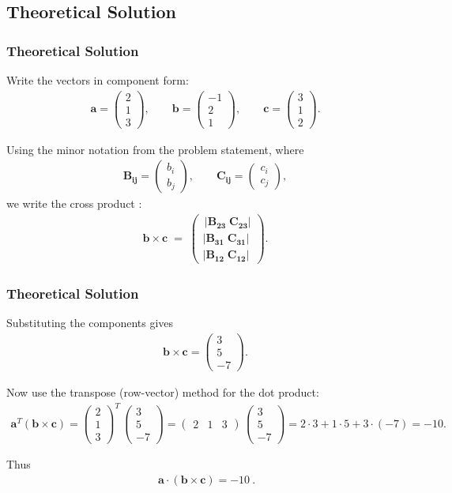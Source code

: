 \documentclass{beamer}
\theoremstyle{remark}
\newcommand{\myvec}[1]{\ensuremath{\begin{pmatrix}#1\end{pmatrix}}}
\let\vec\mathbf
\numberwithin{equation}{section}
\begin{document}
\subsection{Theoretical Solution }
\begin{frame}
\frametitle{Theoretical Solution}
Write the vectors in component form:
\begin{align}
\vec a=\myvec{2\\[4pt]1\\[4pt]3},\qquad
\vec b=\myvec{-1\\[4pt]2\\[4pt]1},\qquad
\vec c=\myvec{3\\[4pt]1\\[4pt]2}.
\end{align}

Using the minor notation from the problem statement, where
\begin{align}
\vec{B_{ij}}=\myvec{b_i\\[4pt]b_j},\qquad \vec{C_{ij}}=\myvec{c_i\\[4pt]c_j},
\end{align}
we write the cross product :
\begin{align}
\vec b\times\vec c \;=\;
\myvec{\,\lvert \vec{B_{23}}\;\vec{C_{23}}\rvert \\[6pt] \lvert \vec{B_{31}}\;\vec{C_{31}}\rvert \\[6pt] \lvert \vec{B_{12}}\;\vec{C_{12}}\rvert\, }.
\end{align}
\end{frame}

\begin{frame}
\frametitle{Theoretical Solution}
Substituting the components gives
\begin{align}
\vec b\times\vec c = \myvec{3\\[4pt]5\\[4pt]-7}.
\end{align}

Now use the transpose (row-vector) method for the dot product:
\begin{align}
\vec a^{\!T}(\vec b\times\vec c)
= \myvec{2\\[4pt]1\\[4pt]3}^{\!T}\,\myvec{3\\[4pt]5\\[4pt]-7}
= \myvec{2 & 1 & 3}\,\myvec{3\\[4pt]5\\[4pt]-7}
= 2\cdot 3 + 1\cdot 5 + 3\cdot(-7) = -10.
\end{align}

Thus
\begin{align}
\boxed{\ \vec a\cdot(\vec b\times\vec c) = -10\ }.
\end{align}

\end{frame}
\end{document}
